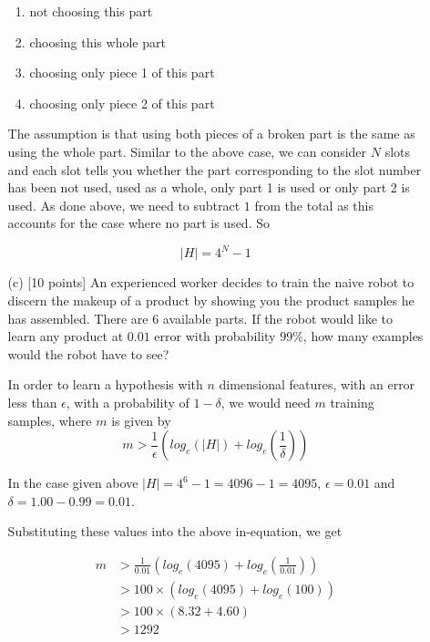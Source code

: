\begin{enumerate}
\begin{itemize}
\begin{enumerate}

\item not choosing this part
\item choosing this whole part 
\item choosing only piece 1 of this part
\item choosing only piece 2 of this part

\end{enumerate}

The assumption is that using both pieces of a broken part is the same as using the whole part. Similar to the above case, we can consider $N$ slots and each slot tells you whether the part corresponding to the slot number has been not used, used as a whole, only part 1 is used or only part 2 is used. As done above, we need to subtract $1$ from the total as this accounts for the case where no part is used. So

$$
\left | H \right | = 4^N - 1
$$

\item[(c)] [10 points] An experienced worker decides to train the
  naive robot to discern the makeup of a product by showing you the
  product samples he has assembled. There are 6 available parts. If
  the robot would like to learn any product at $0.01$ error with
  probability $99\%$, how many examples would the robot have to see?
  
In order to learn a hypothesis with $n$ dimensional features, with an error less than $\epsilon$, with a probability of $1-\delta$, we would need $m$ training samples, where $m$ is given by
$$  
m > \frac{1}{\epsilon} \left ( log_e(\left | H \right |) + log_e \left ( \frac{1}{\delta} \right ) \right )
$$

In the case given above $\left | H \right | = 4^6 -1 = 4096-1=4095$, $\epsilon=0.01$ and $\delta=1.00- 0.99=0.01$.

Substituting these values into the above in-equation, we get

\begin{equation*}
\begin{aligned}
m &> \frac{1}{0.01} \left ( log_e(4095) + log_e \left ( \frac{1}{0.01} \right ) \right )\\
&> 100 \times \left ( log_e(4095) + log_e (100) \right )\\
&> 100 \times \left ( 8.32 + 4.60 \right )\\
&>1292
\end{aligned}
\end{equation*}


\end{itemize}
\end{enumerate}
